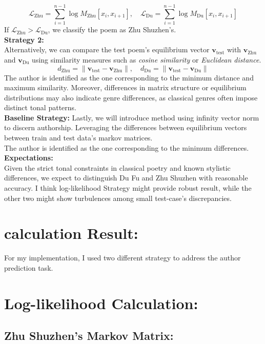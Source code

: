 \documentclass[12pt]{article}
\begin{document}
\[
    \mathcal{L}_{\text{Zhu}} = \sum_{i=1}^{n-1} \log M_{\text{Zhu}}[x_i, x_{i+1}], \quad \mathcal{L}_{\text{Du}} = \sum_{i=1}^{n-1} \log M_{\text{Du}}[x_i, x_{i+1}]
\]
If $\mathcal{L}_{\text{Zhu}} > \mathcal{L}_{\text{Du}}$, we classify the poem as Zhu Shuzhen's.
\\
\textbf{Strategy 2: }
\\
Alternatively, we can compare the test poem’s equilibrium vector $\mathbf{v}_{\text{test}}$ with $\mathbf{v}_{\text{Zhu}}$ and $\mathbf{v}_{\text{Du}}$ using similarity measures such as \textit{cosine similarity} or \textit{Euclidean distance}.
\[
    d_{\text{Zhu}} = \|\mathbf{v}_{\text{test}} - \mathbf{v}_{\text{Zhu}}\|, \quad d_{\text{Du}} = \|\mathbf{v}_{\text{test}} - \mathbf{v}_{\text{Du}}\|
\]
The author is identified as the one corresponding to the minimum distance and maximum similarity. Moreover, differences in matrix structure or equilibrium distributions may also indicate genre differences, as classical genres often impose distinct tonal patterns.
\\
\textbf{Baseline Strategy: }
Lastly, we will introduce method using infinity vector norm to discern authorship. Leveraging the differences between equilibrium vectors between train and test data's markov matrices.
\\
The author is identified as the one corresponding to the minimum differences.
\\
\textbf{Expectations: }
\\
Given the strict tonal constraints in classical poetry and known stylistic differences, we expect to distinguish Du Fu and Zhu Shuzhen with reasonable accuracy. 
I think log-likelihood Strategy might provide robust result, while the other two might show turbulences among small test-case's discrepancies.

\newpage

\section{calculation Result: }
\noindent For my implementation, I used two different strategy to address the author prediction task.

\section*{Log-likelihood Calculation: }

\subsection*{Zhu Shuzhen's Markov Matrix:}
\end{document}
